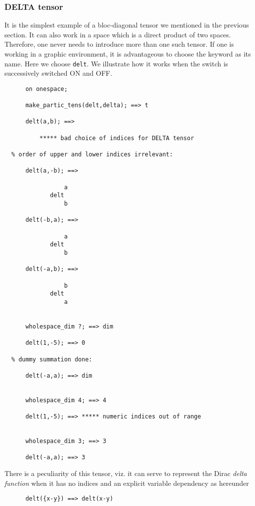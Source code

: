 \subsubsection{DELTA tensor}
It is the simplest example of a bloc-diagonal
tensor we mentioned in the
previous section. It can also work in a space which is a direct product
of two spaces. Therefore, one never needs to introduce more than one
such tensor. If one is working in a graphic environment, it is advantageous
to choose the keyword as its name. Here we choose \texttt{delt}.
We illustrate how it works  when the switch  is
successively switched ON and OFF.
\begin{verbatim}
      on onespace;

      make_partic_tens(delt,delta); ==> t

      delt(a,b); ==>

          ***** bad choice of indices for DELTA tensor

  % order of upper and lower indices irrelevant:

      delt(a,-b); ==>

                 a
             delt
                 b

      delt(-b,a); ==>

                 a
             delt
                 b

      delt(-a,b); ==>

                 b
             delt
                 a


      wholespace_dim ?; ==> dim

      delt(1,-5); ==> 0

  % dummy summation done:

      delt(-a,a); ==> dim


      wholespace_dim 4; ==> 4

      delt(1,-5); ==> ***** numeric indices out of range


      wholespace_dim 3; ==> 3

      delt(-a,a); ==> 3
\end{verbatim}
There is a peculiarity of this tensor, viz. it can serve to represent
the Dirac \emph{delta function}
 when it has no indices and an explicit variable dependency as hereunder
\begin{verbatim}
      delt({x-y}) ==> delt(x-y)
\end{verbatim}
